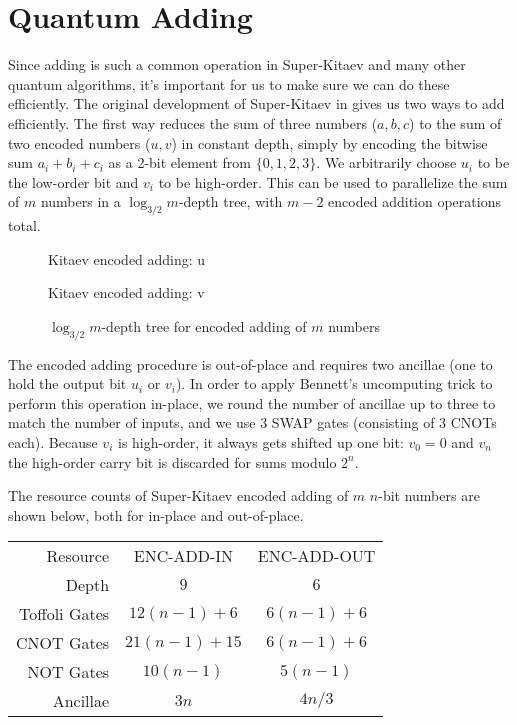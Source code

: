 \section{Quantum Adding}

Since adding is such a common
operation in Super-Kitaev and many other quantum algorithms, it's important
for us to make sure we can do these efficiently.
The original development of Super-Kitaev in \cite{ksv02} gives us two
ways to add efficiently.
The first way reduces the sum of three numbers ($a,b,c$) to the sum of
two encoded numbers ($u,v$) in constant depth, simply by encoding the
bitwise sum $a_i+b_i+c_i$ as a 2-bit element from $\{0,1,2,3\}$. We arbitrarily
choose $u_i$ to be the low-order bit and $v_i$ to be high-order.
This can be used to parallelize the sum of $m$ numbers in
a $\log_{3/2}m$-depth tree, with $m-2$ encoded addition operations total.

\begin{figure}
\caption{Kitaev encoded adding: u}
\end{figure}

\begin{figure}
\caption{Kitaev encoded adding: v}
\end{figure}

\begin{figure}
\caption{$\log_{3/2} m$-depth tree for encoded adding of $m$ numbers}
\end{figure}

The encoded adding procedure is out-of-place and requires two ancillae
(one to hold the output bit $u_i$ or $v_i$). In order to apply
Bennett's uncomputing trick to perform this operation in-place, we round
the number of ancillae up to three to match the number of inputs, and we
use 3 SWAP gates (consisting of 3 CNOTs each). Because $v_i$ is high-order,
it always gets shifted up one bit: $v_0 = 0$ and $v_n$ the high-order carry
bit is discarded for sums modulo $2^n$.

The resource counts of Super-Kitaev encoded adding of $m$ $n$-bit numbers
are shown below, both for in-place and out-of-place.

\begin{tabular}{|r|c|c|}
\hline
Resource      & ENC-ADD-IN      & ENC-ADD-OUT\\
Depth         & $9$             & $6$\\ 
Toffoli Gates & $12 (n-1) + 6$  & $6 (n-1) + 6$\\
CNOT Gates    & $21 (n-1) + 15$ & $6 (n-1) + 6$\\
NOT Gates     & $10 (n-1)$      & $5 (n-1)$\\
Ancillae      & $3n$            & $4n/3$\\ 
\hline
\end{tabular}

